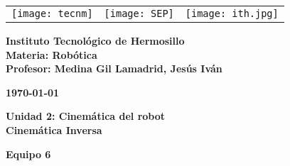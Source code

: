 \begin{titlepage}
	\centering
	\begin{tabular}{@{}p{} p{} p{}@{}}
		\texttt{[image: tecnm]} & 
		\centering \texttt{[image: SEP]} & 
		\raggedleft \texttt{[image: ith.jpg]} \\
	\end{tabular}
	
	\vspace{2em}
	
	\noindent
	\begin{minipage}[t]{0.48\textwidth}
		\raggedright
		\small \textbf{%
			Instituto Tecnológico de Hermosillo\\
			Materia: Robótica\\
			Profesor: Medina Gil Lamadrid, Jesús Iván%
		}
	\end{minipage}%
	\hfill
	\begin{minipage}[t]{0.48\textwidth}
		\raggedleft
		\small \textbf{\today}
	\end{minipage}
	
	\vspace{2em}
	
	{\large \textbf{Unidad 2: Cinemática del robot}}\\
	\vspace{1em}
	{\Huge \textbf{Cinemática Inversa}}
		
	\vspace{1em}
	
	\begin{center}
		{\Large \textbf{Equipo 6}}
	\end{center}
	
	\vspace{1em}
	

\end{titlepage}

